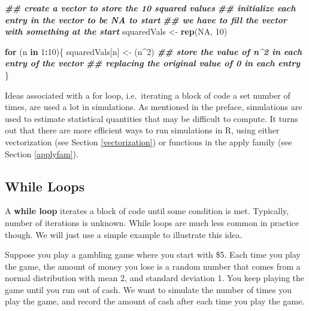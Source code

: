\documentclass[
]{book}
\newenvironment{Shaded}{\begin{snugshade}}{\end{snugshade}}
\newcommand{\ConstantTok}[1]{\textcolor[rgb]{0.56,0.35,0.01}{#1}}
\newcommand{\ControlFlowTok}[1]{\textcolor[rgb]{0.13,0.29,0.53}{\textbf{#1}}}
\newcommand{\DecValTok}[1]{\textcolor[rgb]{0.00,0.00,0.81}{#1}}
\newcommand{\DocumentationTok}[1]{\textcolor[rgb]{0.56,0.35,0.01}{\textbf{\textit{#1}}}}
\newcommand{\FunctionTok}[1]{\textcolor[rgb]{0.13,0.29,0.53}{\textbf{#1}}}
\newcommand{\NormalTok}[1]{#1}
\newcommand{\OtherTok}[1]{\textcolor[rgb]{0.56,0.35,0.01}{#1}}
\newcommand{\SpecialCharTok}[1]{\textcolor[rgb]{0.81,0.36,0.00}{\textbf{#1}}}
\theoremstyle{definition}
\theoremstyle{definition}
\theoremstyle{definition}
\theoremstyle{definition}
\theoremstyle{remark}
\begin{document}
\begin{Shaded}
\begin{Highlighting}[]
\DocumentationTok{\#\# create a vector to store the 10 squared values}
\DocumentationTok{\#\# initialize each entry in the vector to be NA to start}
\DocumentationTok{\#\# we have to fill the vector with something at the start}
\NormalTok{squaredVals }\OtherTok{\textless{}{-}} \FunctionTok{rep}\NormalTok{(}\ConstantTok{NA}\NormalTok{, }\DecValTok{10}\NormalTok{)}

\ControlFlowTok{for}\NormalTok{ (n }\ControlFlowTok{in} \DecValTok{1}\SpecialCharTok{:}\DecValTok{10}\NormalTok{)\{}
\NormalTok{  squaredVals[n] }\OtherTok{\textless{}{-}}\NormalTok{ (n}\SpecialCharTok{\^{}}\DecValTok{2}\NormalTok{) }
  \DocumentationTok{\#\# store the value of n\^{}2 in each entry of the vector}
  \DocumentationTok{\#\# replacing the original value of 0 in each entry}
\NormalTok{\}}
\end{Highlighting}
\end{Shaded}

Ideas associated with a for loop, i.e.~iterating a block of code a set number of times, are used a lot in simulations. As mentioned in the preface, simulations are used to estimate statistical quantities that may be difficult to compute. It turns out that there are more efficient ways to run simulations in R, using either vectorization (see Section \ref{vectorization}) or functions in the apply family (see Section \ref{applyfam}).

\hypertarget{while-loops}{%
\subsection{While Loops}\label{while-loops}}

A \textbf{while loop} iterates a block of code until some condition is met. Typically, number of iterations is unknown. While loops are much less common in practice though. We will just use a simple example to illustrate this idea.

Suppose you play a gambling game where you start with \$5. Each time you play the game, the amount of money you lose is a random number that comes from a normal distribution with mean 2, and standard deviation 1. You keep playing the game until you run out of cash. We want to simulate the number of times you play the game, and record the amount of cash after each time you play the game.
\end{document}
